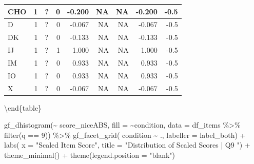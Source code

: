 \documentclass[
  letterpaper,
  DIV=11,
  numbers=noendperiod]{scrreprt}
\newenvironment{Shaded}{\begin{snugshade}}{\end{snugshade}}
\newcommand{\AttributeTok}[1]{\textcolor[rgb]{0.40,0.45,0.13}{#1}}
\newcommand{\DecValTok}[1]{\textcolor[rgb]{0.68,0.00,0.00}{#1}}
\newcommand{\FunctionTok}[1]{\textcolor[rgb]{0.28,0.35,0.67}{#1}}
\newcommand{\NormalTok}[1]{\textcolor[rgb]{0.00,0.23,0.31}{#1}}
\newcommand{\SpecialCharTok}[1]{\textcolor[rgb]{0.37,0.37,0.37}{#1}}
\newcommand{\StringTok}[1]{\textcolor[rgb]{0.13,0.47,0.30}{#1}}
\begin{document}
\begin{tabular}[t]{l|r|l|r|r|r|r|r|r}
\hline
\hspace{1em}CHO & 1 & ? & 0 & -0.200 & NA & NA & -0.200 & -0.5\\
\hline
\hspace{1em}D & 1 & ? & 0 & -0.067 & NA & NA & -0.067 & -0.5\\
\hline
\hspace{1em}DK & 1 & ? & 0 & -0.133 & NA & NA & -0.133 & -0.5\\
\hline
\hspace{1em}IJ & 1 & ? & 1 & 1.000 & NA & NA & 1.000 & -0.5\\
\hline
\hspace{1em}IM & 1 & ? & 0 & 0.933 & NA & NA & 0.933 & -0.5\\
\hline
\hspace{1em}IO & 1 & ? & 0 & 0.933 & NA & NA & 0.933 & -0.5\\
\hline
\hspace{1em}X & 1 & ? & 0 & -0.067 & NA & NA & -0.067 & -0.5\\
\hline
\end{tabular}

\textbackslash end\{table\}

\begin{Shaded}
\begin{Highlighting}[]
\FunctionTok{gf\_dhistogram}\NormalTok{(}\SpecialCharTok{\textasciitilde{}}\NormalTok{ score\_niceABS, }\AttributeTok{fill =} \SpecialCharTok{\textasciitilde{}}\NormalTok{condition, }\AttributeTok{data =}\NormalTok{ df\_items }\SpecialCharTok{\%\textgreater{}\%} \FunctionTok{filter}\NormalTok{(q }\SpecialCharTok{==} \DecValTok{9}\NormalTok{)) }\SpecialCharTok{\%\textgreater{}\%} 
  \FunctionTok{gf\_facet\_grid}\NormalTok{( condition }\SpecialCharTok{\textasciitilde{}}\NormalTok{ ., }\AttributeTok{labeller =}\NormalTok{ label\_both) }\SpecialCharTok{+} 
  \FunctionTok{labs}\NormalTok{( }\AttributeTok{x =} \StringTok{"Scaled Item Score"}\NormalTok{, }\AttributeTok{title =} \StringTok{"Distribution of Scaled Scores | Q9 "}\NormalTok{) }\SpecialCharTok{+} 
  \FunctionTok{theme\_minimal}\NormalTok{() }\SpecialCharTok{+} \FunctionTok{theme}\NormalTok{(}\AttributeTok{legend.position =} \StringTok{"blank"}\NormalTok{)}
\end{Highlighting}
\end{Shaded}
\end{document}
